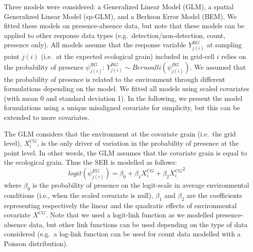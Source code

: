 \documentclass[
  12pt,
  a4paper]{article}
\begin{document}
Three models were considered: a Generalized Linear Model (GLM), a spatial Generalized Linear Model (sp-GLM), and a Berkson Error Model (BEM). We fitted these models on presence-absence data, but note that these models can be applied to other response data types (e.g.~detection/non-detection, count, presence only). All models assume that the response variable \(Y^{RG}_{j(i)}\) at sampling point \(j(i)\) (i.e.~at the expected ecological grain) included in grid-cell \(i\) relies on the probability of presence \(\psi^{RG}_{j(i)}\): \(Y^{RG}_{j(i)} \sim Bernoulli(\psi^{RG}_{j(i)})\). We assumed that the probability of presence is related to the environment through different formulations depending on the model. We fitted all models using scaled covariates (with mean 0 and standard deviation 1). In the following, we present the model formulations using a unique misaligned covariate for simplicity, but this can be extended to more covariates.

The GLM considers that the environment at the covariate grain (i.e.~the grid level), \(X^{CG}_i\), is the only driver of variation in the probability of presence at the point level. In other words, the GLM assumes that the covariate grain is equal to the ecological grain. Thus the SER is modelled as follows:
\[ logit(\psi^{EG}_{j(i)}) = \beta_0 + \beta_1 X^{CG}_i + \beta_2 {X^{CG}_i}^2 \]
where \(\beta_0\) is the probability of presence on the logit-scale in average environmental conditions (i.e., when the scaled covariate is null), \(\beta_1\) and \(\beta_2\) are the coefficients representing respectively the linear and the quadratic effects of environmental covariate \(X^{CG}\). Note that we used a logit-link function as we modelled presence-absence data, but other link functions can be used depending on the type of data considered (e.g.~a log-link function can be used for count data modelled with a Poisson distribution).
\end{document}

